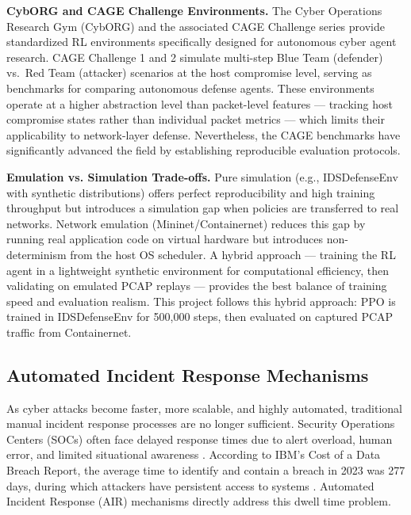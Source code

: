 \documentclass[12pt,a4paper]{report}
\begin{document}
\textbf{CybORG and CAGE Challenge Environments.} The Cyber Operations Research Gym (CybORG) and the associated CAGE Challenge series \cite{cage2021, cage2022} provide standardized RL environments specifically designed for autonomous cyber agent research. CAGE Challenge 1 and 2 simulate multi-step Blue Team (defender) vs.\ Red Team (attacker) scenarios at the host compromise level, serving as benchmarks for comparing autonomous defense agents. These environments operate at a higher abstraction level than packet-level features --- tracking host compromise states rather than individual packet metrics --- which limits their applicability to network-layer defense. Nevertheless, the CAGE benchmarks have significantly advanced the field by establishing reproducible evaluation protocols.

\textbf{Emulation vs. Simulation Trade-offs.} Pure simulation (e.g., IDSDefenseEnv with synthetic distributions) offers perfect reproducibility and high training throughput but introduces a simulation gap when policies are transferred to real networks. Network emulation (Mininet/Containernet) reduces this gap by running real application code on virtual hardware but introduces non-determinism from the host OS scheduler. A hybrid approach --- training the RL agent in a lightweight synthetic environment for computational efficiency, then validating on emulated PCAP replays --- provides the best balance of training speed and evaluation realism. This project follows this hybrid approach: PPO is trained in IDSDefenseEnv for 500,000 steps, then evaluated on captured PCAP traffic from Containernet.

\subsection{Automated Incident Response Mechanisms}

As cyber attacks become faster, more scalable, and highly automated, traditional manual incident response processes are no longer sufficient. Security Operations Centers (SOCs) often face delayed response times due to alert overload, human error, and limited situational awareness \cite{alertFatigue2022}. According to IBM's Cost of a Data Breach Report, the average time to identify and contain a breach in 2023 was 277 days, during which attackers have persistent access to systems \cite{ibmCostBreach2023}. Automated Incident Response (AIR) mechanisms directly address this dwell time problem.
\end{document}
